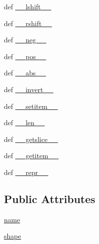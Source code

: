 \begin{DoxyCompactItemize}
def \hyperlink{classscipy_1_1weave_1_1size__check_1_1dummy__array_adf9eadd1055da6babf40b199004dc164}{\+\_\+\+\_\+lshift\+\_\+\+\_\+}
\item 
def \hyperlink{classscipy_1_1weave_1_1size__check_1_1dummy__array_aa4f267e85b3748c93efd04d699114971}{\+\_\+\+\_\+rshift\+\_\+\+\_\+}
\item 
def \hyperlink{classscipy_1_1weave_1_1size__check_1_1dummy__array_a747b920355da30250c8006757262df3a}{\+\_\+\+\_\+neg\+\_\+\+\_\+}
\item 
def \hyperlink{classscipy_1_1weave_1_1size__check_1_1dummy__array_af847b47753f3165f76544c841661ed2a}{\+\_\+\+\_\+pos\+\_\+\+\_\+}
\item 
def \hyperlink{classscipy_1_1weave_1_1size__check_1_1dummy__array_af9fe9ab3189007f03e423584eb12032c}{\+\_\+\+\_\+abs\+\_\+\+\_\+}
\item 
def \hyperlink{classscipy_1_1weave_1_1size__check_1_1dummy__array_aca92407fe6afc3e879f46e62c6e1f801}{\+\_\+\+\_\+invert\+\_\+\+\_\+}
\item 
def \hyperlink{classscipy_1_1weave_1_1size__check_1_1dummy__array_a5a3ed6ab7819525f0957f54ba66f16c4}{\+\_\+\+\_\+setitem\+\_\+\+\_\+}
\item 
def \hyperlink{classscipy_1_1weave_1_1size__check_1_1dummy__array_a301fa0412644ad4836e8d3bdc99bb878}{\+\_\+\+\_\+len\+\_\+\+\_\+}
\item 
def \hyperlink{classscipy_1_1weave_1_1size__check_1_1dummy__array_a6713a13a4b88e928271606e4b8ca0212}{\+\_\+\+\_\+getslice\+\_\+\+\_\+}
\item 
def \hyperlink{classscipy_1_1weave_1_1size__check_1_1dummy__array_abd76381c0e96ecba99f6cb62b70e6354}{\+\_\+\+\_\+getitem\+\_\+\+\_\+}
\item 
def \hyperlink{classscipy_1_1weave_1_1size__check_1_1dummy__array_a053c3bd317dd6ef1cc5bed3fa838aeb5}{\+\_\+\+\_\+repr\+\_\+\+\_\+}
\end{DoxyCompactItemize}
\subsection*{Public Attributes}
\begin{DoxyCompactItemize}
\item 
\hyperlink{classscipy_1_1weave_1_1size__check_1_1dummy__array_ad6522fa516f1109776c546297c104760}{name}
\item 
\hyperlink{classscipy_1_1weave_1_1size__check_1_1dummy__array_afae75b13e29a2dd86ae8c5cd0dfd6f61}{shape}
\end{DoxyCompactItemize}


